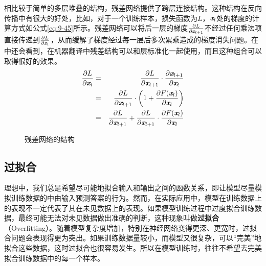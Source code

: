 \begin{itemize}
相比较于简单的多层堆叠的结构，残差网络提供了跨层连接结构。这种结构在反向传播中有很大的好处，比如，对于一个训练样本，损失函数为$L$，$ \textbf{\em x}_l $处的梯度的计算方式如公式\eqref{eq:9-45}所示。残差网络可以将后一层的梯度$ \frac{\partial L}{\partial {\textbf{\em x}}_{l+1}} $不经过任何乘法项直接传递到$ \frac{\partial L}{\partial {\textbf{\em x}}_l} $，从而缓解了梯度经过每一层后多次累乘造成的梯度消失问题。在{\chaptertwelve}中还会看到，在机器翻译中残差结构可以和层标准化一起使用，而且这种组合可以取得很好的效果。
\begin{eqnarray}
\frac{\partial L}{\partial {\textbf{\em x}}_l}&=&\frac{\partial L}{\partial {\textbf{\em x}}_{l+1}} \cdot  \frac{\partial {\textbf{\em x}}_{l+1}}{\partial {\textbf{\em x}}_l}\nonumber\\
&=&\frac{\partial L}{\partial {\textbf{\em x}}_{l+1}} \cdot \left(1+\frac{\partial F({\textbf{\em x}}_l)}{\partial {\textbf{\em x}}_l}\right)\nonumber\\
&=&\frac{\partial L}{\partial {\textbf{\em x}}_{l+1}}+\frac{\partial L}{\partial {\textbf{\em x}}_{l+1}} \cdot  \frac{\partial F({\textbf{\em x}}_l)}{\partial {\textbf{\em x}}_l}
\label{eq:9-45}
\end{eqnarray}


\begin{figure}[htp]
\centering

\caption{残差网络的结构}
\label{fig:9-51}
\end{figure}
\end{itemize}


\subsection{过拟合}\label{sec:9.4.5}

\parinterval  理想中，我们总是希望尽可能地拟合输入和输出之间的函数关系，即让模型尽量模拟训练数据的中由输入预测答案的行为。然而，在实际应用中，模型在训练数据上的表现不一定代表了其在未见数据上的表现。如果模型训练过程中过度拟合训练数据，最终可能无法对未见数据做出准确的判断，这种现象叫做{\small\sffamily\bfseries{过拟合}}（Overfitting）。随着模型复杂度增加，特别在神经网络变得更深、更宽时，过拟合问题会表现得更为突出。如果训练数据量较小，而模型又很复杂，可以“完美”地拟合这些数据，这时过拟合也很容易发生。所以在模型训练时，往往不希望去完美拟合训练数据中的每一个样本。


